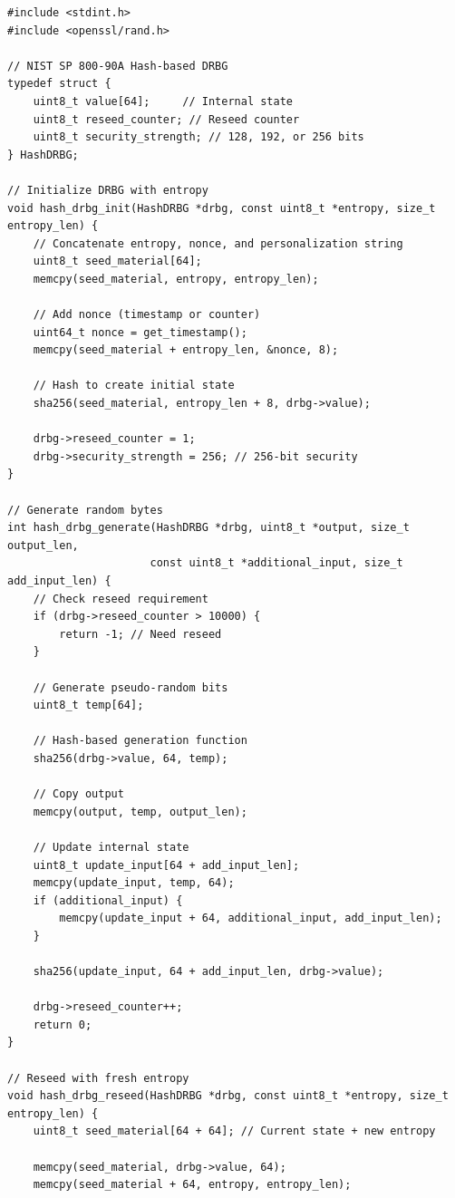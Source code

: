 \begin{lstlisting}[style=cstyle, caption={CSPRNG Implementation}]
#include <stdint.h>
#include <openssl/rand.h>

// NIST SP 800-90A Hash-based DRBG
typedef struct {
    uint8_t value[64];     // Internal state
    uint8_t reseed_counter; // Reseed counter
    uint8_t security_strength; // 128, 192, or 256 bits
} HashDRBG;

// Initialize DRBG with entropy
void hash_drbg_init(HashDRBG *drbg, const uint8_t *entropy, size_t entropy_len) {
    // Concatenate entropy, nonce, and personalization string
    uint8_t seed_material[64];
    memcpy(seed_material, entropy, entropy_len);
    
    // Add nonce (timestamp or counter)
    uint64_t nonce = get_timestamp();
    memcpy(seed_material + entropy_len, &nonce, 8);
    
    // Hash to create initial state
    sha256(seed_material, entropy_len + 8, drbg->value);
    
    drbg->reseed_counter = 1;
    drbg->security_strength = 256; // 256-bit security
}

// Generate random bytes
int hash_drbg_generate(HashDRBG *drbg, uint8_t *output, size_t output_len,
                      const uint8_t *additional_input, size_t add_input_len) {
    // Check reseed requirement
    if (drbg->reseed_counter > 10000) {
        return -1; // Need reseed
    }
    
    // Generate pseudo-random bits
    uint8_t temp[64];
    
    // Hash-based generation function
    sha256(drbg->value, 64, temp);
    
    // Copy output
    memcpy(output, temp, output_len);
    
    // Update internal state
    uint8_t update_input[64 + add_input_len];
    memcpy(update_input, temp, 64);
    if (additional_input) {
        memcpy(update_input + 64, additional_input, add_input_len);
    }
    
    sha256(update_input, 64 + add_input_len, drbg->value);
    
    drbg->reseed_counter++;
    return 0;
}

// Reseed with fresh entropy
void hash_drbg_reseed(HashDRBG *drbg, const uint8_t *entropy, size_t entropy_len) {
    uint8_t seed_material[64 + 64]; // Current state + new entropy
    
    memcpy(seed_material, drbg->value, 64);
    memcpy(seed_material + 64, entropy, entropy_len);
    

\end{lstlisting}
